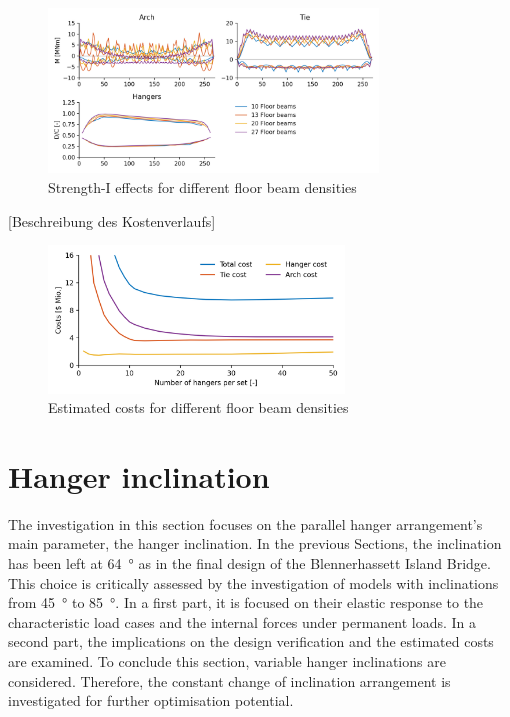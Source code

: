 \begin{figure}[H]
    \centering
    \includegraphics[trim={0 0.4cm 0 0.4cm},clip, width=0.78\textwidth]{calculations/floor beam comparison/strength-I.png}
    \caption{Strength-I effects for different floor beam densities}
    \label{fig:fb_strength}
\end{figure}

[Beschreibung des Kostenverlaufs]

\begin{figure}[H]
    \centering
    \includegraphics[width=0.7\textwidth]{calculations/floor beam comparison/cost comparison.png}
    \caption{Estimated costs for different floor beam densities}
    \label{fig:fb_costs}
\end{figure}


\newpage
\section{Hanger inclination} \label{sec:inclination}
The investigation in this section focuses on the parallel hanger arrangement's main parameter, the hanger inclination. In the previous Sections, the inclination has been left at \SI{64}{\degree} as in the final design of the Blennerhassett Island Bridge. This choice is critically assessed by the investigation of models with inclinations from \SI{45}{\degree} to \SI{85}{\degree}. In a first part, it is focused on their elastic response to the characteristic load cases and the internal forces under permanent loads.  In a second part, the implications on the design verification and the estimated costs are examined. To conclude this section, variable hanger inclinations are considered. Therefore, the constant change of inclination arrangement is investigated for further optimisation potential.


